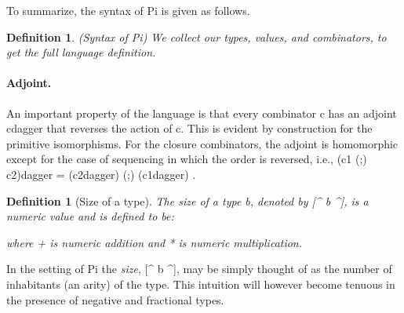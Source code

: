 \documentclass[preprint]{sigplanconf}
\newtheorem{definition}[theorem]{Definition}
\newtheorem{proposition}[theorem]{Proposition}
\begin{document}
\noindent
To summarize, the syntax of {{Pi}} is given as follows. 

\begin{definition}{(Syntax of {{Pi}})}
\label{def:Pi}
We collect our types, values, and combinators, to get the full language
definition.
%
\end{definition}

\paragraph*{Adjoint.} 
An important property of the language is that every combinator {{c}} has an
adjoint {{c{dagger}}} that reverses the action of {{c}}. This is evident by
construction for the primitive isomorphisms. For the closure combinators, the
adjoint is homomorphic except for the case of sequencing in which the order
is reversed, i.e., {{(c1 (;) c2){dagger} = (c2{dagger}) (;) (c1{dagger}) }}.

\begin{definition}[Size of a type]
\label{def:size}
The size of a type {{b}}, denoted by {{[^ b ^]}}, is a numeric value
and is defined to be:
\vspace{-20pt}
\begin{multicols}{2}

\end{multicols}

where {{+}} is numeric addition and {{*}} is numeric multiplication. 
  
\end{definition}
\noindent
In the setting of {{Pi}} the \emph{size}, {{[^ b ^]}}, may be simply thought of as
the number of inhabitants (an arity) of the type. This intuition will
however become tenuous in the presence of negative and fractional
types.

\end{document}
